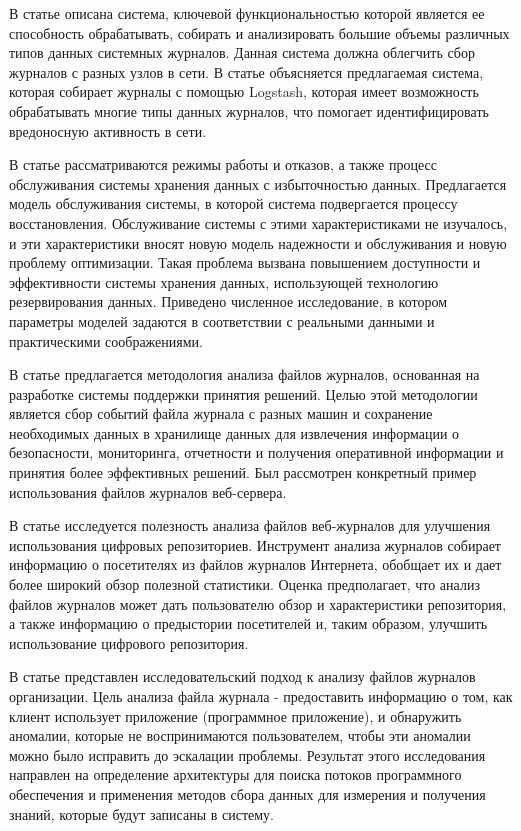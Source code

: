 \documentclass[12pt,a4paper]{article}
\begin{document}
В статье \cite{Article6} описана система, ключевой функциональностью которой является ее способность обрабатывать, собирать и анализировать большие объемы различных типов данных системных журналов. Данная система должна облегчить сбор журналов с разных узлов в сети. В статье объясняется предлагаемая система, которая собирает журналы с помощью Logstash, которая имеет возможность обрабатывать многие типы данных журналов, что помогает идентифицировать вредоносную активность в сети.

В статье \cite{Article7} рассматриваются режимы работы и отказов, а также процесс обслуживания системы хранения данных с избыточностью данных. Предлагается модель обслуживания системы, в которой система подвергается процессу восстановления. Обслуживание системы с этими характеристиками не изучалось, и эти характеристики вносят новую модель надежности и обслуживания и новую проблему оптимизации. Такая проблема вызвана повышением доступности и эффективности системы хранения данных, использующей технологию резервирования данных. Приведено численное исследование, в котором параметры моделей задаются в соответствии с реальными данными и практическими соображениями.

В статье \cite{Article8} предлагается методология анализа файлов журналов, основанная на разработке системы поддержки принятия решений. Целью этой методологии является сбор событий файла журнала с разных машин и сохранение необходимых данных в хранилище данных для извлечения информации о безопасности, мониторинга, отчетности и получения оперативной информации и принятия более эффективных решений. Был рассмотрен конкретный пример использования файлов журналов веб-сервера.

В статье \cite{Article9} исследуется полезность анализа файлов веб-журналов для улучшения использования цифровых репозиториев. Инструмент анализа журналов собирает информацию о посетителях из файлов журналов Интернета, обобщает их и дает более широкий обзор полезной статистики. Оценка предполагает, что анализ файлов журналов может дать пользователю обзор и характеристики репозитория, а также информацию о предыстории посетителей и, таким образом, улучшить использование цифрового репозитория.

В статье \cite{Article10} представлен исследовательский подход к анализу файлов журналов организации. Цель анализа файла журнала - предоставить информацию о том, как клиент использует приложение (программное приложение), и обнаружить аномалии, которые не воспринимаются пользователем, чтобы эти аномалии можно было исправить до эскалации проблемы. Результат этого исследования направлен на определение архитектуры для поиска потоков программного обеспечения и применения методов сбора данных для измерения и получения знаний, которые будут записаны в систему.
\end{document}

